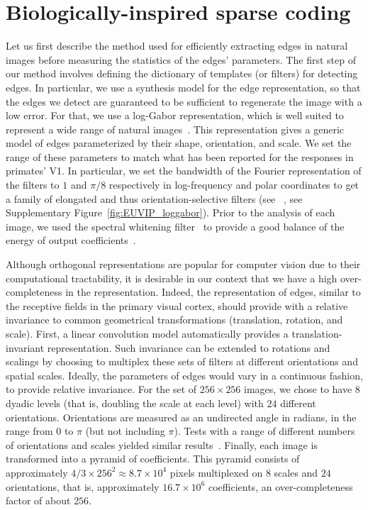 \documentclass{article}
\begin{document}
\section{Biologically-inspired sparse coding}
Let us first describe the method used for efficiently extracting edges in natural images before measuring the statistics of the edges' parameters. The first step of our method involves defining the dictionary of templates (or filters) for detecting edges. In particular, we use a synthesis model for the edge representation, so that the edges we detect are guaranteed to be sufficient to regenerate the image with a low error. For that, we use a log-Gabor representation, which is well suited to represent a wide range of natural images~\citep{Fischer07}. This representation gives a generic model of edges parameterized by their shape, orientation, and scale. We set the range of these parameters to match what has been reported for the responses in primates' V1. In particular, we set the bandwidth of the Fourier representation of the filters to $1$ and $\pi/8$ respectively in log-frequency and polar coordinates to get a family of elongated and thus orientation-selective filters (see~\citep{Fischer07cv}\if{} , see Supplementary Figure~\ref{fig:EUVIP_loggabor}\fi). Prior to the analysis of each image, we used the spectral whitening filter~\citep{Olshausen97} to provide a good balance of the energy of output coefficients~\citep{Perrinet03ieee,Fischer07}.

Although orthogonal representations are popular for computer vision due to their computational tractability, it is desirable in our context that we have a high over-completeness in the representation. Indeed, the representation of edges, similar to the receptive fields in the primary visual cortex, should provide with a relative invariance to common geometrical transformations (translation, rotation, and scale). First, a linear convolution model automatically provides a translation-invariant representation. Such invariance can be extended to rotations and scalings by choosing to multiplex these sets of filters at different orientations and spatial scales. Ideally, the parameters of edges would vary in a continuous fashion, to provide relative invariance. For the set of $256\times 256$ images, we chose to have $8$ dyadic levels (that is, doubling the scale at each level) with $24$ different orientations. Orientations are measured as an undirected angle in radians, in the range from $0$ to $\pi$ (but not including $\pi$). Tests with a range of different numbers of orientations and scales yielded similar results~\citep{Perrinet15bicv}. Finally, each image is transformed into a pyramid of coefficients. This pyramid consists of approximately $4/3\times256^{2}\approx8.7\times10^4$ pixels multiplexed on $8$ scales and $24$ orientations, that is, approximately $16.7\times10^6$ coefficients, an over-completeness factor of about $256$.
\end{document}
